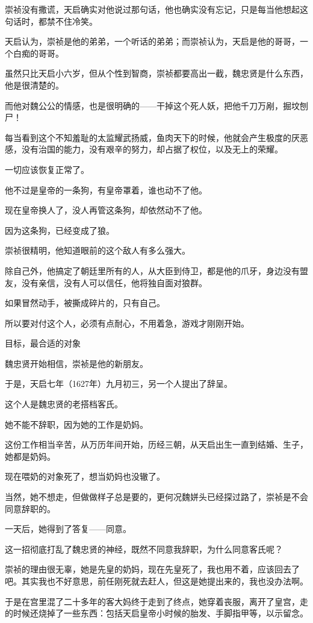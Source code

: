 \begin{multicols}{\theparacolNo}
崇祯没有撒谎，天启确实对他说过那句话，他也确实没有忘记，只是每当他想起这句话时，都禁不住冷笑。

天启认为，崇祯是他的弟弟，一个听话的弟弟；而崇祯认为，天启是他的哥哥，一个白痴的哥哥。

虽然只比天启小六岁，但从个性到智商，崇祯都要高出一截，魏忠贤是什么东西，他是很清楚的。

而他对魏公公的情感，也是很明确的——干掉这个死人妖，把他千刀万剐，掘坟刨尸！

每当看到这个不知羞耻的太监耀武扬威，鱼肉天下的时候，他就会产生极度的厌恶感，没有治国的能力，没有艰辛的努力，却占据了权位，以及无上的荣耀。

一切应该恢复正常了。

他不过是皇帝的一条狗，有皇帝罩着，谁也动不了他。

现在皇帝换人了，没人再管这条狗，却依然动不了他。

因为这条狗，已经变成了狼。

崇祯很精明，他知道眼前的这个敌人有多么强大。

除自己外，他搞定了朝廷里所有的人，从大臣到侍卫，都是他的爪牙，身边没有盟友，没有亲信，没有人可以信任，他将独自面对狼群。

如果冒然动手，被撕成碎片的，只有自己。

所以要对付这个人，必须有点耐心，不用着急，游戏才刚刚开始。

目标，最合适的对象

魏忠贤开始相信，崇祯是他的新朋友。

于是，天启七年（1627年）九月初三，另一个人提出了辞呈。

这个人是魏忠贤的老搭档客氏。

她不能不辞职，因为她的工作是奶妈。

这份工作相当辛苦，从万历年间开始，历经三朝，从天启出生一直到结婚、生子，她都是奶妈。

现在喂奶的对象死了，想当奶妈也没辙了。

当然，她不想走，但做做样子总是要的，更何况魏姘头已经探过路了，崇祯是不会同意辞职的。

一天后，她得到了答复——同意。

这一招彻底打乱了魏忠贤的神经，既然不同意我辞职，为什么同意客氏呢？

崇祯的理由很无辜，她是先皇的奶妈，现在先皇死了，我也用不着，应该回去了吧。其实我也不好意思，前任刚死就去赶人，但这是她提出来的，我也没办法啊。

于是在宫里混了二十多年的客大妈终于走到了终点，她穿着丧服，离开了皇宫，走的时候还烧掉了一些东西：包括天启皇帝小时候的胎发、手脚指甲等，以示留念。


\end{multicols}
